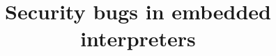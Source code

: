 \documentclass[11pt,letterpaper,twocolumn]{article}
\begin{document}
\title{Security bugs in embedded interpreters}

\date{}
\maketitle









\footnotesize
\setlength{\bibsep}{3pt}

\end{document}
